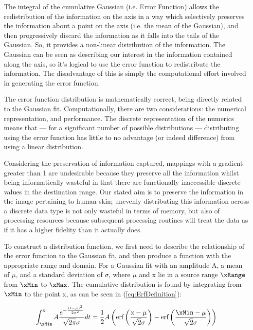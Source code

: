 The integral of the cumulative Gaussian (i.e. Error Function) allows the redistribution of the information on the axis in a way which selectively preserves the information about a point on the axis (i.e. the mean of the Gaussian), and then progressively discard the information as it falls into the tails of the Gaussian. So, it provides a non-linear distribution of the information. The Gaussian can be seen as describing our interest in the information contained along the axis, so it's logical to use the error function to redistribute the information. The disadvantage of this is simply the computational effort involved in generating the error function.

The error function distribution is mathematically correct, being directly related to the Gaussian fit. Computationally, there are two considerations: the numerical representation, and performance. The discrete representation of the numerics means that --- for a significant number of possible distributions --- distributing using the error function has little to no advantage (or indeed difference) from using a linear distribution.

Considering the preservation of information captured, mappings with a gradient greater than 1 are undesirable because they preserve all the information whilst being informatically wasteful in that there are functionally inaccessible discrete values in the destination range. Our stated aim is to preserve the information in the image pertaining to human skin; unevenly distributing this information across a discrete data type is not only wasteful in terms of memory, but also of processing resources because subsequent processing routines will treat the data as if it has a higher fidelity than it actually does.

To construct a distribution function, we first need to describe the relationship of the error function to the Gaussian fit, and then produce a function with the appropriate range and domain. For a Gaussian fit with an amplitude A, a mean of $\mu$, and a standard deviation of $\sigma$, where $\mu$ and x lie in a source range $\xRange$ from $\xMin$ to $\xMax$. The cumulative distribution is found by integrating from $\xMin$ to the point x, as can be seen in (\ref{eq:ErfDefinition}):

\begin{equation}\label{eq:ErfDefinition}
  \int _{\xMin}^{\text{x}} A \frac{e^{-\frac{(t-\mu )^2}{2 \sigma ^2}}}{\sqrt{2 \pi } \sigma }dt=\frac{1}{2} A \left(\text{erf}\left(\frac{\text{x}-\mu }{\sqrt{2} \sigma }\right)-\text{erf}\left(\frac{\xMin-\mu }{\sqrt{2} \sigma }\right)\right)
\end{equation}


